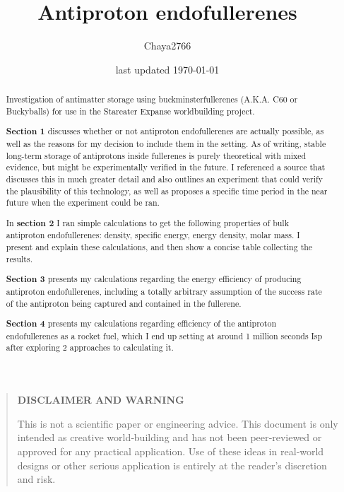 \documentclass[a4paper]{article}
\title{Antiproton endofullerenes}
\author{Chaya2766}
\date{last updated \today}
\begin{document}
	\sffamily
	\hyphenchar{}
	\sloppy
	
	\maketitle
	
	\textbf{
		\sloppy
		\hyphenchar{}
		}
	
	\vfill
	
	\begin{abstract}
		Investigation of antimatter storage using buckminsterfullerenes (A.K.A. C60 or Buckyballs) for use in the Stareater Expanse worldbuilding project.
		
		\medskip
		
		\textbf{Section 1} discusses whether or not antiproton endofullerenes are actually possible, as well as the reasons for my decision to include them in the setting.
		As of writing, stable long-term storage of antiprotons inside fullerenes is purely theoretical with mixed evidence, but might be experimentally verified in the future.
		I referenced a source that discusses this in much greater detail and also outlines an experiment that could verify the plausibility of this technology, as well as proposes a specific time period in the near future when the experiment could be ran.
		
		\medskip
		
		In \textbf{section 2} I ran simple calculations to get the following properties of bulk antiproton endofullerenes: density, specific energy, energy density, molar mass.
		I present and explain these calculations, and then show a concise table collecting the results.
		
		\medskip
		
		\textbf{Section 3} presents my calculations regarding the energy efficiency of producing antiproton endofullerenes, including a totally arbitrary assumption of the success rate of the antiproton being captured and contained in the fullerene.
		
		\medskip
		
		\textbf{Section 4} presents my calculations regarding efficiency of the antiproton endofullerenes as a rocket fuel, which I end up setting at around 1 million seconds Isp after exploring 2 approaches to calculating it.
	\end{abstract}
	
	\vfill
	
	\begin{quote}
		\begin{center}
			\textbf{DISCLAIMER AND WARNING}
		\end{center}
		
		This is not a scientific paper or engineering advice.
		This document is only intended as creative world‑building and has not been peer‑reviewed or approved for any practical application.
		Use of these ideas in real‑world designs or other serious application is entirely at the reader’s discretion and risk.
	\end{quote}
	
\end{document}
